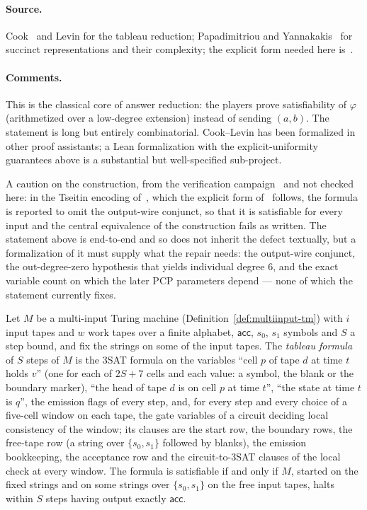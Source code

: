 \paragraph{Source.} Cook~\cite{Coo71} and Levin for the tableau reduction; Papadimitriou
and Yannakakis~\cite{PY86} for succinct representations and their complexity;
the explicit form needed here is~\cite[Section 10]{JNVWY20}.

\paragraph{Comments.} This is the classical core of answer reduction: the players prove
satisfiability of $\varphi$ (arithmetized over a low-degree extension) instead of
sending $(a,b)$. The statement is long but entirely combinatorial. Cook--Levin has been
formalized in other proof assistants; a Lean formalization with the explicit-uniformity
guarantees above is a substantial but well-specified sub-project.

A caution on the construction, from the verification campaign~\cite{Audit26} and not
checked here: in the Tseitin encoding of~\cite{NW19}, which the explicit form
of~\cite[Section 10]{JNVWY20} follows, the formula is reported to omit the output-wire
conjunct, so that it is satisfiable for every input and the central equivalence of the
construction fails as written. The statement above is end-to-end and so does not inherit
the defect textually, but a formalization of it must supply what the repair needs: the
output-wire conjunct, the out-degree-zero hypothesis that yields individual degree $6$,
and the exact variable count on which the later PCP parameters depend --- none of which
the statement currently fixes.

\begin{lemma}
\label{lem:correct-tableau}
\leanok
Let $M$ be a multi-input Turing machine (Definition~\ref{def:multiinput-tm}) with $i$ input
tapes and $w$ work tapes over a finite alphabet, $\mathsf{acc}$, $s_0$, $s_1$ symbols and
$S$ a step bound, and fix the strings on some of the input tapes. The \emph{tableau formula}
of $S$ steps of $M$ is the 3SAT formula on the variables ``cell $p$ of tape $d$ at time $t$
holds $v$'' (one for each of $2S + 7$ cells and each value: a symbol, the blank or the
boundary marker), ``the head of tape $d$ is on cell $p$ at time $t$'', ``the state at time
$t$ is $q$'', the emission flags of every step, and, for every step and every choice of a
five-cell window on each tape, the gate variables of a circuit deciding local consistency
of the window; its clauses are the start row, the boundary rows, the free-tape row (a
string over $\{s_0, s_1\}$ followed by blanks), the emission bookkeeping, the acceptance
row and the circuit-to-3SAT clauses of the local check at every window. The formula is
satisfiable if and only if $M$, started on the fixed strings and on some strings over
$\{s_0, s_1\}$ on the free input tapes, halts within $S$ steps having output exactly
$\mathsf{acc}$.
\end{lemma}


